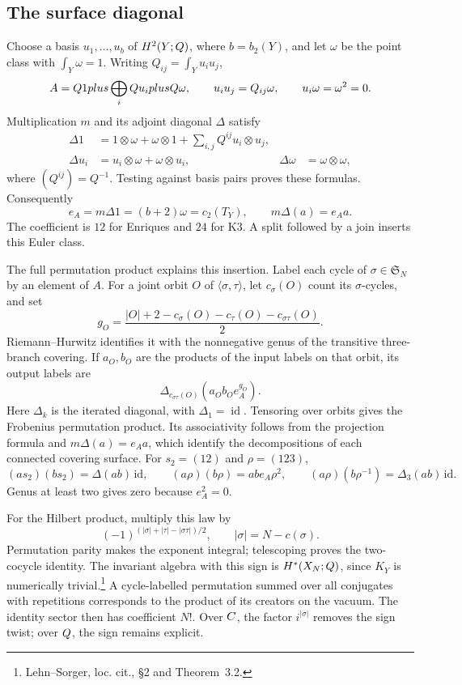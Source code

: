 \subsection{The surface diagonal}

Choose a basis \(u_1,\ldots,u_b\) of \(H^2(Y;Q)\), where \(b=b_2(Y)\),
and let \(\omega\) be the point class with \(\int_Y\omega=1\).
Writing \(Q_{ij}=\int_Yu_iu_j\),
\[
 A=Q1plus\bigoplus_iQ u_iplusQ\omega,
 \qquad u_iu_j=Q_{ij}\omega,
 \qquad u_i\omega=\omega^2=0.
\]
Multiplication \(m\) and its adjoint diagonal \(\Delta\) satisfy
\begin{align*}
 \Delta1&=1\otimes\omega+\omega\otimes1
              +\sum_{i,j}Q^{ij}u_i\otimes u_j,\\
 \Delta u_i&=u_i\otimes\omega+\omega\otimes u_i,
 &\Delta\omega&=\omega\otimes\omega,
\end{align*}
where \((Q^{ij})=Q^{-1}\).  Testing against basis pairs proves
these formulas.  Consequently
\[
 e_A=m\Delta1=(b+2)\omega=c_2(T_Y),\qquad m\Delta(a)=e_Aa.
\]
The coefficient is \(12\) for Enriques and \(24\) for K3.
A split followed by a join inserts this Euler class.

The full permutation product explains this insertion.  Label each
cycle of \(\sigma\in\mathfrak S_N\) by an element of \(A\).
For a joint orbit \(O\) of \(\langle\sigma,\tau\rangle\), let
\(c_\sigma(O)\) count its \(\sigma\)-cycles, and set
\[
 g_O=\frac{|O|+2-c_\sigma(O)-c_\tau(O)-c_{\sigma\tau}(O)}2.
\]
Riemann--Hurwitz identifies it with the nonnegative genus of the
transitive three-branch covering.  If \(a_O,b_O\) are the products
of the input labels on that orbit, its output labels are
\[
 \Delta_{c_{\sigma\tau}(O)}(a_Ob_Oe_A^{g_O}).
\]
Here \(\Delta_k\) is the iterated diagonal, with
\(\Delta_1=\operatorname{id}\).
Tensoring over orbits gives the Frobenius permutation product.
Its associativity follows from the projection formula and
\(m\Delta(a)=e_Aa\), which identify the decompositions of each
connected covering surface.  For \(s_2=(12)\) and \(\rho=(123)\),
\[
 (as_2)(bs_2)=\Delta(ab)\,\mathrm{id},\qquad
 (a\rho)(b\rho)=abe_A\rho^2,
 \qquad (a\rho)(b\rho^{-1})=\Delta_3(ab)\,\mathrm{id}.
\]
Genus at least two gives zero because \(e_A^2=0\).

For the Hilbert product, multiply this law by
\[
 (-1)^{(|\sigma|+|\tau|-|\sigma\tau|)/2},
 \qquad |\sigma|=N-c(\sigma).
\]
Permutation parity makes the exponent integral; telescoping proves
the two-cocycle identity.  The invariant algebra with this sign
is \(H^*(X_N;Q)\), since \(K_Y\) is numerically trivial.\footnote{
Lehn--Sorger, loc. cit., \S2 and Theorem~3.2.}
A cycle-labelled permutation summed over all conjugates with
repetitions corresponds to the product of its creators on the
vacuum.  The identity sector then has coefficient \(N!\).
Over \(C\), the factor \(i^{|\sigma|}\) removes the sign twist;
over \(Q\), the sign remains explicit.

